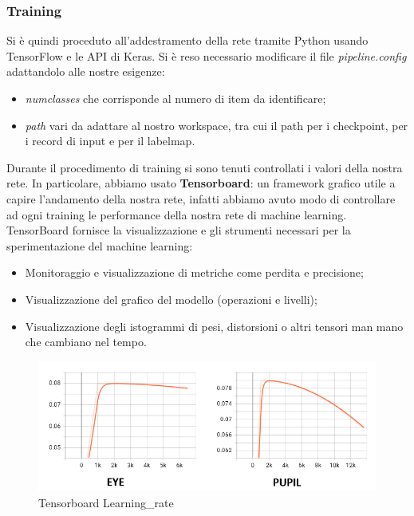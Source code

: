 \documentclass[11pt]{article}
\begin{document}
\subsubsection{Training}
\label{ssu:tra}
Si è quindi proceduto all’addestramento della rete tramite Python usando TensorFlow e le API di Keras. Si è reso necessario modificare il file \textit{pipeline.config} adattandolo alle nostre esigenze: 
\begin{itemize}
    \item \textit{numclasses} che corrisponde al numero di item da identificare;
    \item \textit{path} vari da adattare al nostro workspace, tra cui il path per i checkpoint, per i record di input e per il labelmap.
\end{itemize}
\newline
Durante il procedimento di training si sono tenuti controllati i valori della nostra rete. In particolare, abbiamo usato \textbf{Tensorboard}: un framework grafico utile a capire l'andamento della nostra rete, infatti abbiamo avuto modo di controllare ad ogni training le performance della nostra rete di machine learning.
\newline
TensorBoard fornisce la visualizzazione e gli strumenti necessari per la sperimentazione del machine learning:
\begin{itemize}
    \item Monitoraggio e visualizzazione di metriche come perdita e precisione;
    \item Visualizzazione del grafico del modello (operazioni e livelli);
    \item Visualizzazione degli istogrammi di pesi, distorsioni o altri tensori man mano che cambiano nel tempo.
\end{itemize}


\begin{figure}[h]
\caption{Tensorboard Learning\_rate}
\centering
\includegraphics[scale=0.7]{img/learning_rate_both_edited.png}
\end{figure}
\end{document}
